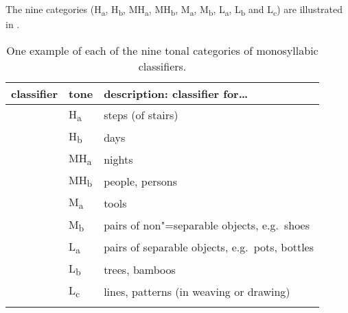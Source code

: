 
The nine categories (H\textsubscript{a}, H\textsubscript{b}, MH\textsubscript{a}, MH\textsubscript{b}, M\textsubscript{a}, M\textsubscript{b}, L\textsubscript{a}, L\textsubscript{b} and L\textsubscript{c}) are illustrated in . 

\newpage 
\begin{table}[h]
	\caption{One example of each of the nine tonal categories of {monosyllabic} classifiers.}
	\begin{tabularx}{\textwidth}{ Q Q l }
		\lsptoprule
		classifier & tone & description: classifier for{\dots}\\ \midrule
		 & H\textsubscript{a} & steps (of stairs)\\
		 & H\textsubscript{b} & days\\
		 & MH\textsubscript{a} & nights\\
		 & MH\textsubscript{b} & people, persons\\
		 & M\textsubscript{a} & tools\\
		 & M\textsubscript{b} & pairs of non"=separable objects, e.g.~shoes\\
		 & L\textsubscript{a} & pairs of separable objects, e.g.~pots, bottles\\
		 & L\textsubscript{b} & trees, bamboos\\
		 & L\textsubscript{c} & lines, patterns (in weaving or drawing)\\
		\lspbottomrule
	\end{tabularx}
	\label{tab:oneexampleofeachofthetonalcategoriesofclassifiers}
\end{table}


